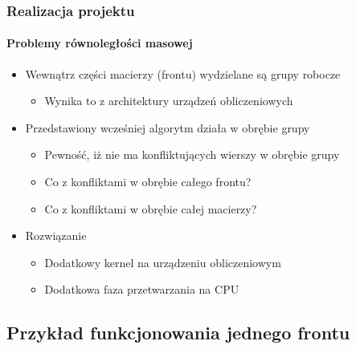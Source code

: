 \documentclass{beamer}
\begin{document}
\begin{frame}
\frametitle{Realizacja projektu}
\framesubtitle{Problemy równoległości masowej}
\begin{itemize}[<+->]
\item Wewnątrz części macierzy (frontu) wydzielane są grupy robocze
	\begin{itemize}
	\item Wynika to z architektury urządzeń obliczeniowych
	\end{itemize}
\item Przedstawiony wcześniej algorytm działa w obrębie grupy
	\begin{itemize}
	\item Pewność, iż nie ma konfliktujących wierszy w obrębie grupy
	\item Co z konfliktami w obrębie całego frontu?
	\item Co z konfliktami w obrębie całej macierzy?
	\end{itemize}
\item Rozwiązanie
	\begin{itemize}
	\item Dodatkowy kernel na urządzeniu obliczeniowym
	\item Dodatkowa faza przetwarzania na CPU
	\end{itemize}
\end{itemize}
\end{frame}

\subsection{Przykład funkcjonowania jednego frontu}
\end{document}
